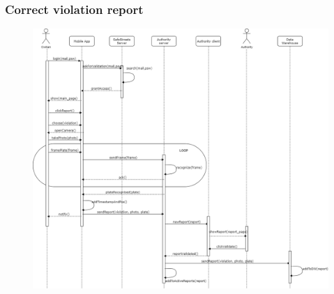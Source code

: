 \documentclass[12pt,a4paper]{article}
\begin{document}
		\subsubsection{Correct violation report}
			\begin{figure}[H]
				\centering
				\includegraphics[width=1.2\textwidth,height=.9\textheight]{Images/Civilian_report}
				\label{fig:request_subscription_sequence}
			\end{figure}
\end{document}

